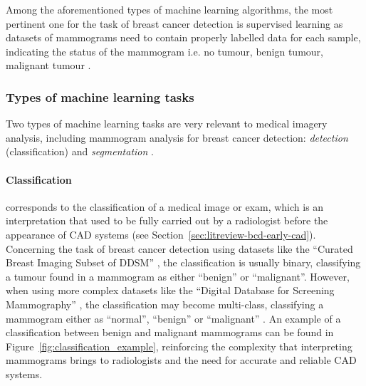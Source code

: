 Among the aforementioned types of machine learning algorithms, the most pertinent one for the task of breast cancer detection is supervised learning as datasets of mammograms need to contain properly labelled data for each sample, indicating the status of the mammogram i.e. no tumour, benign tumour, malignant tumour \citep{Shen2017}.

\subsubsection{Types of machine learning tasks}

Two types of machine learning tasks are very relevant to medical imagery analysis, including mammogram analysis for breast cancer detection: \textit{detection} (classification) and \textit{segmentation} \citep{Litjens2017}. 

\paragraph{Classification} corresponds to the classification of a medical image or exam, which is an interpretation that used to be fully carried out by a radiologist before the appearance of CAD systems (see Section~\ref{sec:litreview-bcd-early-cad}). Concerning the task of breast cancer detection using datasets like the ``Curated Breast Imaging Subset of DDSM'' \citep{Lee2017}, the classification is usually binary, classifying a tumour found in a mammogram as either ``benign'' or ``malignant''. However, when using more complex datasets like the ``Digital Database for Screening Mammography'' \citep{DDSMdataset2001}, the classification may become multi-class, classifying a mammogram either as ``normal'', ``benign'' or ``malignant'' \citep{Litjens2017}. An example of a classification between benign and malignant mammograms can be found in Figure~\ref{fig:classification_example}, reinforcing the complexity that interpreting mammograms brings to radiologists and the need for accurate and reliable CAD systems.

